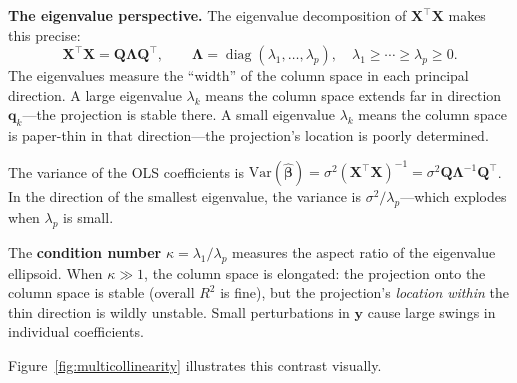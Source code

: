 \documentclass[11pt,a4paper]{article}
\theoremstyle{plain}
\theoremstyle{definition}
\newcommand{\bhat}{\hat{\bm{\beta}}}
\newcommand{\bX}{\bm{X}}
\newcommand{\by}{\bm{y}}
\newcommand{\bQ}{\bm{Q}}
\DeclareMathOperator{\diag}{diag}
\begin{document}
\medskip
\noindent\textbf{The eigenvalue perspective.}
The eigenvalue decomposition of $\bX^\top\bX$ makes this precise:
\[
  \bX^\top\bX = \bQ\bm{\Lambda}\bQ^\top,
  \qquad
  \bm{\Lambda} = \diag(\lambda_1,\dots,\lambda_p),
  \quad \lambda_1\ge\cdots\ge\lambda_p\ge 0.
\]
The eigenvalues measure the ``width'' of the column space in each principal direction.
A large eigenvalue $\lambda_k$ means the column space extends far in direction $\bm{q}_k$---the projection is stable there.
A small eigenvalue $\lambda_k$ means the column space is paper-thin in that direction---the projection's location is poorly determined.

The variance of the OLS coefficients is $\text{Var}(\bhat) = \sigma^2(\bX^\top\bX)^{-1} = \sigma^2\bQ\bm{\Lambda}^{-1}\bQ^\top$.
In the direction of the smallest eigenvalue, the variance is $\sigma^2/\lambda_p$---which explodes when $\lambda_p$ is small.

The \textbf{condition number} $\kappa = \lambda_1/\lambda_p$
measures the aspect ratio of the eigenvalue ellipsoid.
When $\kappa \gg 1$, the column space is elongated: the projection
onto the column space is stable (overall $R^2$ is fine), but the
projection's \emph{location within} the thin direction is wildly
unstable. Small perturbations in $\by$ cause large swings
in individual coefficients.

Figure~\ref{fig:multicollinearity} illustrates this contrast visually.

\end{document}
